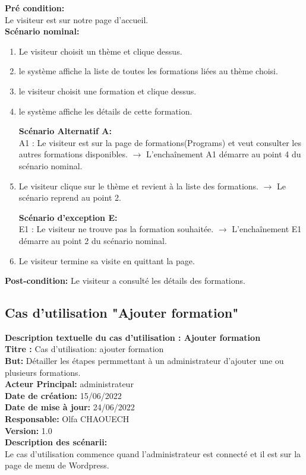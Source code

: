 	 \textbf{Pré condition:}\\
	Le visiteur est sur notre page d'accueil.\\
	\textbf{Scénario nominal:}
	\begin{enumerate}
		\item Le visiteur choisit un thème et clique dessus.
		\item le système affiche la liste de toutes les formations liées au thème choisi.
		\item le visiteur choisit une formation et clique dessus.
		\item le système affiche les détails de cette formation.

    \textbf{Scénario Alternatif A:}\\
    A1 : Le visiteur est sur la page de formations(Programs) et veut consulter les autres formations disponibles.
    $\rightarrow$ L'enchaînement A1 démarre au point 4 du scénario nominal.
    \item Le visiteur clique sur le thème et revient à la liste des formations.
    $\rightarrow$ Le scénario reprend au point 2.
    
\textbf{Scénario d'exception E:}\\
E1 : Le visiteur ne trouve pas la formation souhaitée.
$\rightarrow$ L'enchaînement E1 démarre au point 2 du scénario nominal.

\item Le visiteur termine sa visite en quittant la page.
\end{enumerate}
\textbf{Post-condition:}
Le visiteur a consulté les détails des formations.
\subsection{Cas d'utilisation "Ajouter formation"}
\textbf{Description textuelle du cas d'utilisation : Ajouter formation}\\
\textbf{Titre :} Cas d'utilisation: ajouter formation\\
\textbf{But:} Détailler les étapes permmettant à un administrateur d'ajouter une ou plusieurs formations.\\
\textbf{Acteur Principal:} administrateur\\
\textbf{Date de création:} 15/06/2022\\
\textbf{Date de mise à jour:} 24/06/2022\\
\textbf{Responsable:} Olfa CHAOUECH\\
\textbf{Version:} 1.0\\
\textbf{Description des scénarii:}\\
Le cas d'utilisation commence quand l'administrateur est connecté et il est sur la page de menu de Wordpress.

